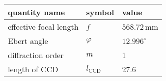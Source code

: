 \begin{tabular}{lll}
\toprule
quantity name          & symbol         & value \\
\midrule
effective focal length & $f$            & 568.72\,mm \\
Ebert angle            & $\varphi$      & $12.996^\circ$ \\
diffraction order      & $m$            & 1 \\
length of CCD          & $l_\text{CCD}$ & 27.6 \\
\bottomrule
\end{tabular}
